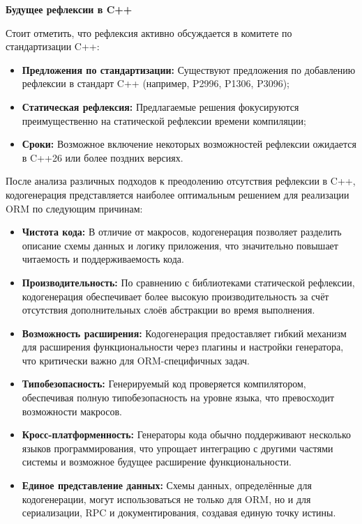         \textbf{Будущее рефлексии в C++}
        
            Стоит отметить, что рефлексия активно обсуждается в комитете по стандартизации C++:
            
            \begin{itemize}
                \item \textbf{Предложения по стандартизации:} Существуют предложения по добавлению рефлексии в стандарт C++ (например, P2996, P1306, P3096);
                
                \item \textbf{Статическая рефлексия:} Предлагаемые решения фокусируются преимущественно на статической рефлексии времени компиляции;
                
                \item \textbf{Сроки:} Возможное включение некоторых возможностей рефлексии ожидается в C++26 или более поздних версиях.
            \end{itemize}


        После анализа различных подходов к преодолению отсутствия рефлексии в C++, кодогенерация представляется наиболее оптимальным решением для реализации ORM по следующим причинам:

        \begin{itemize}
            \item \textbf{Чистота кода:} В отличие от макросов, кодогенерация позволяет разделить описание схемы данных и логику приложения, что значительно повышает читаемость и поддерживаемость кода.
            
            \item \textbf{Производительность:} По сравнению с библиотеками статической рефлексии, кодогенерация обеспечивает более высокую производительность за счёт отсутствия дополнительных слоёв абстракции во время выполнения.
            
            \item \textbf{Возможность расширения:} Кодогенерация предоставляет гибкий механизм для расширения функциональности через плагины и настройки генератора, что критически важно для ORM-специфичных задач.
            
            \item \textbf{Типобезопасность:} Генерируемый код проверяется компилятором, обеспечивая полную типобезопасность на уровне языка, что превосходит возможности макросов.
            
            \item \textbf{Кросс-платформенность:} Генераторы кода обычно поддерживают несколько языков программирования, что упрощает интеграцию с другими частями системы и возможное будущее расширение функциональности.
            
            \item \textbf{Единое представление данных:} Схемы данных, определённые для кодогенерации, могут использоваться не только для ORM, но и для сериализации, RPC и документирования, создавая единую точку истины.
        \end{itemize}

